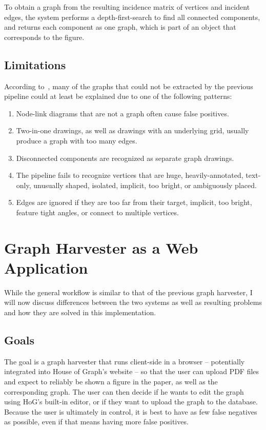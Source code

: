 \documentclass[practical,english]{info1thesis}
\begin{document}
To obtain a graph from the resulting incidence matrix of vertices and incident edges, the system performs a depth-first-search to find all connected components, and returns each component as one graph, which is part of an object that corresponds to the figure.

\subsection{Limitations}
According to~\cite{mooney_et_al:LIPIcs.GD.2025.30}, many of the graphs that could not be extracted by the previous pipeline could at least be explained due to one of the following patterns:
\begin{enumerate}
    \item Node-link diagrams that are not a graph often cause false positives.
    \item Two-in-one drawings, as well as drawings with an underlying grid, usually produce a graph with too many edges.
    \item Disconnected components are recognized as separate graph drawings.
    \item The pipeline fails to recognize vertices that are huge, heavily-annotated, text-only, unusually shaped, isolated, implicit, too bright, or ambiguously placed. 
    \item Edges are ignored if they are too far from their target, implicit, too bright, feature tight angles, or connect to multiple vertices.
\end{enumerate}


\section{Graph Harvester as a Web Application}
While the general workflow is similar to that of the previous graph harvester, I will now discuss differences between the two systems as well as resulting problems and how they are solved in this implementation.

\subsection{Goals}
The goal is a graph harvester that runs client-side in a browser -- potentially integrated into House of Graph's website -- so that the user can upload PDF files and expect to reliably be shown a figure in the paper, as well as the corresponding graph.
The user can then decide if he wants to edit the graph using HoG's built-in editor, or if they want to upload the graph to the database.
Because the user is ultimately in control, it is best to have as few false negatives as possible, even if that means having more false positives.
\end{document}
